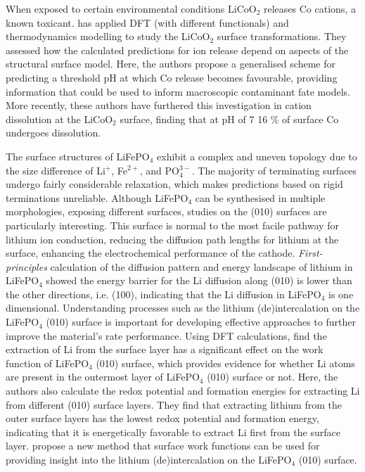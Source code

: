 \documentclass[../main.tex]{subfiles}
\begin{document}
When exposed to certain environmental conditions LiCoO$_2$ releases Co cations, a known toxicant. \citeauthor{abbaspour2020dft} has applied DFT (with different functionals) and thermodynamics modelling to study the LiCoO$_2$ surface transformations. \cite{abbaspour2020dft} They assessed how the calculated predictions for ion release depend on aspects of the structural surface model. Here, the authors propose a generalised scheme for predicting a threshold pH at which Co release becomes favourable, providing information that could be used to inform macroscopic contaminant fate models. More recently, these authors have furthered this investigation in cation dissolution at the LiCoO$_2$ surface, finding that at pH of 7 16 \% of surface Co undergoes dissolution. \cite{abbaspour2020dft}

The surface structures of LiFePO$_4$ exhibit a complex and uneven topology due to the size difference of Li$^+$, Fe$^{2+}$, and PO$_{4}^{3-}$. The majority of terminating surfaces undergo fairly considerable relaxation, which makes predictions based on rigid terminations unreliable. Although LiFePO$_4$ can be synthesised in multiple morphologies, \cite{chen2006electron,ellis2007synthesis} exposing different surfaces, studies on the (010) surfaces are particularly interesting. This surface is normal to the most facile pathway for lithium ion conduction, \cite{islam2010recent} reducing the diffusion path lengths for lithium at the surface, enhancing the electrochemical performance of the cathode. \textit{First-principles} calculation of the diffusion pattern and energy landscape of lithium in LiFePO$_4$ showed the energy barrier for the Li diffusion along (010) is lower than the other directions, i.e. (100), indicating that the Li diffusion in LiFePO$_4$ is one dimensional. \cite{tankhilsaikhan2019density} Understanding processes such as the lithium (de)intercalation on the LiFePO$_4$ (010) surface is important for developing effective approaches to further improve the material's rate performance. Using DFT calculations, \citeauthor{xu2019insight} find the extraction of Li from the surface layer has a significant effect on the work function of LiFePO$_4$ (010) surface, which provides evidence for whether Li atoms are present in the outermost layer of LiFePO$_4$ (010) surface or not. \cite{xu2019insight} Here, the authors also calculate the redox potential and formation energies for extracting Li from different (010) surface layers. They find that extracting lithium from the outer surface layers has the lowest redox potential and formation energy, indicating that it is energetically favorable to extract Li first from the surface layer. \citeauthor{xu2019insight} propose a new method that surface work functions can be used for providing insight into the lithium (de)intercalation on the LiFePO$_4$ (010) surface. \cite{xu2019insight}
\end{document}
